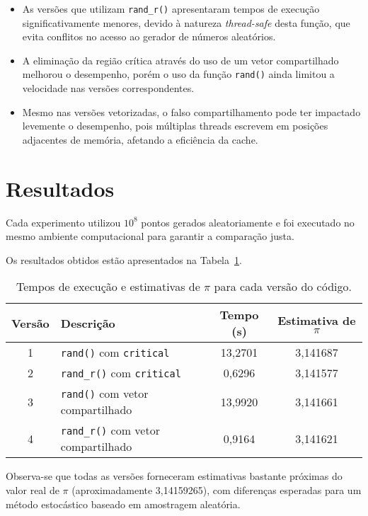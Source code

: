 \documentclass[a4paper, 12pt]{article}
\begin{document}
	\begin{itemize}
		\item As versões que utilizam \texttt{rand\_r()} apresentaram tempos de execução significativamente menores, devido à natureza \textit{thread-safe} desta função, que evita conflitos no acesso ao gerador de números aleatórios.
		\item A eliminação da região crítica através do uso de um vetor compartilhado melhorou o desempenho, porém o uso da função \texttt{rand()} ainda limitou a velocidade nas versões correspondentes.
		\item Mesmo nas versões vetorizadas, o falso compartilhamento pode ter impactado levemente o desempenho, pois múltiplas threads escrevem em posições adjacentes de memória, afetando a eficiência da cache.
	\end{itemize}
	
	\section{Resultados}
	
	Cada experimento utilizou $10^8$ pontos gerados aleatoriamente e foi executado no mesmo ambiente computacional para garantir a comparação justa.
	
	Os resultados obtidos estão apresentados na Tabela~\ref{tab:resultados}.
	
	\begin{table}[H]
		\centering
		\begin{tabular}{|c|l|c|c|}
			\hline
			\textbf{Versão} & \textbf{Descrição} & \textbf{Tempo (s)} & \textbf{Estimativa de $\pi$} \\
			\hline
			1 & \texttt{rand()} com \texttt{critical} & 13,2701 & 3,141687 \\
			\hline
			2 & \texttt{rand\_r()} com \texttt{critical} & 0,6296 & 3,141577 \\
			\hline
			3 & \texttt{rand()} com vetor compartilhado & 13,9920 & 3,141661 \\
			\hline
			4 & \texttt{rand\_r()} com vetor compartilhado & 0,9164 & 3,141621 \\
			\hline
		\end{tabular}
		\caption{Tempos de execução e estimativas de $\pi$ para cada versão do código.}
		\label{tab:resultados}
	\end{table}
	
	Observa-se que todas as versões forneceram estimativas bastante próximas do valor real de $\pi$ (aproximadamente 3,14159265), com diferenças esperadas para um método estocástico baseado em amostragem aleatória.
	
\end{document}

